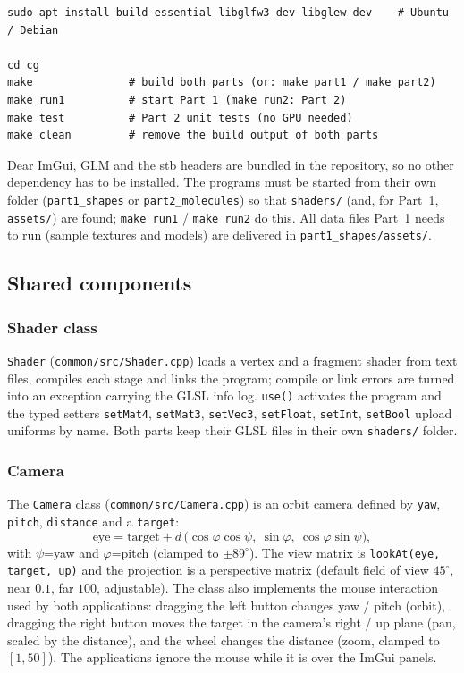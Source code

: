 \documentclass[a4paper, 11pt]{article}
\newcommand{\code}[1]{\texttt{#1}}
\begin{document}
\begin{verbatim}
sudo apt install build-essential libglfw3-dev libglew-dev    # Ubuntu / Debian

cd cg
make               # build both parts (or: make part1 / make part2)
make run1          # start Part 1 (make run2: Part 2)
make test          # Part 2 unit tests (no GPU needed)
make clean         # remove the build output of both parts
\end{verbatim}
Dear ImGui, GLM and the stb headers are bundled in the repository, so no other dependency has to be installed. The programs must be started from their own folder
(\code{part1\_shapes} or \code{part2\_molecules}) so that \code{shaders/} (and, for Part~1, \code{assets/}) are found; \code{make run1} / \code{make run2} do this.
All data files Part~1 needs to run (sample textures and models) are delivered in \code{part1\_shapes/assets/}.

\subsection{Shared components}

\subsubsection{Shader class}
\code{Shader} (\code{common/src/Shader.cpp}) loads a vertex and a fragment shader from text files, compiles each stage and links the program; compile or link errors are
turned into an exception carrying the GLSL info log. \code{use()} activates the program and the typed setters \code{setMat4}, \code{setMat3}, \code{setVec3}, \code{setFloat}, \code{setInt}, \code{setBool}
upload uniforms by name. Both parts keep their GLSL files in their own \code{shaders/} folder.

\subsubsection{Camera}\label{sec:camera}
The \code{Camera} class (\code{common/src/Camera.cpp}) is an orbit camera defined by \code{yaw}, \code{pitch}, \code{distance} and a \code{target}:
\[
  \text{eye}=\text{target}+d\,\bigl(\cos\varphi\cos\psi,\ \sin\varphi,\ \cos\varphi\sin\psi\bigr),
\]
with $\psi$=yaw and $\varphi$=pitch (clamped to $\pm89^\circ$). The view matrix is \code{lookAt(eye, target, up)} and the projection is a perspective matrix
(default field of view $45^\circ$, near $0.1$, far $100$, adjustable). The class also implements the mouse interaction used by both applications:
dragging the left button changes yaw / pitch (orbit), dragging the right button moves the target in the camera's right / up plane (pan, scaled by the distance),
and the wheel changes the distance (zoom, clamped to $[1,50]$). The applications ignore the mouse while it is over the ImGui panels.
\end{document}
